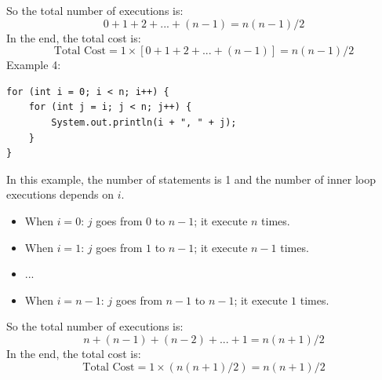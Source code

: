 \documentclass[letterpaper,12pt]{article}
\begin{document}
So the total number of executions is:
$$0 + 1 + 2 + ... + (n-1) = n(n-1)/2$$
In the end, the total cost is:
$$\text{Total Cost} = 1 \times [0 + 1 + 2 + ... + (n-1)] = n(n-1)/2$$
Example 4:
\begin{verbatim}
for (int i = 0; i < n; i++) {
    for (int j = i; j < n; j++) {
        System.out.println(i + ", " + j);
    }
}
\end{verbatim}
In this example, the number of statements is 1 and the number of inner loop executions depends on $i$.
\begin{itemize}
    \item When $i = 0$: $j$ goes from $0$ to $n-1$; it execute $n$ times.
    \item When $i = 1$: $j$ goes from $1$ to $n-1$; it execute $n-1$ times.
    \item ...
    \item When $i = n-1$: $j$ goes from $n-1$ to $n-1$; it execute $1$ times.
\end{itemize}
So the total number of executions is:
$$n + (n-1) + (n-2) + ... + 1 = n(n+1)/2$$
In the end, the total cost is:
$$\text{Total Cost} = 1 \times (n(n+1)/2) = n(n+1)/2$$
\end{document}
